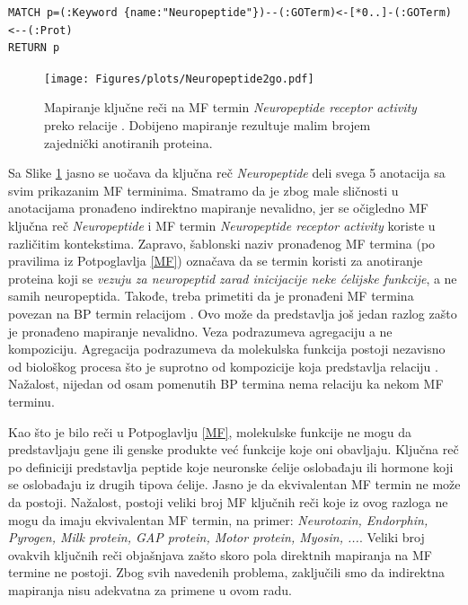 { \small
\begin{verbatim}
MATCH p=(:Keyword {name:"Neuropeptide"})--(:GOTerm)<-[*0..]-(:GOTerm)<--(:Prot)
RETURN p
\end{verbatim}
}

\begin{figure}[!th]
\centering
\hspace*{-1.0cm} 
\texttt{[image: Figures/plots/Neuropeptide2go.pdf]}
\decoRule
\caption {
  Mapiranje ključne reči  na MF termin
  \textit{Neuropeptide receptor activity} preko relacije .
  Dobijeno mapiranje rezultuje malim brojem zajednički anotiranih proteina.
}
\label{fig:neuropeptide}
\end{figure}

Sa Slike \ref{fig:neuropeptide} jasno se uočava da ključna reč
\textit{Neuropeptide} deli svega 5 anotacija sa svim prikazanim MF terminima.
Smatramo da je zbog male sličnosti u anotacijama pronađeno indirektno
mapiranje nevalidno, jer se očigledno MF ključna reč \textit{Neuropeptide} i
MF termin \textit{Neuropeptide receptor activity} koriste u različitim
kontekstima. Zapravo, šablonski naziv pronađenog MF termina (po pravilima iz
Potpoglavlja \ref{MF}) označava da se termin koristi za anotiranje proteina
koji se \textit{vezuju za neuropeptid zarad inicijacije neke ćelijske
funkcije}, a ne samih neuropeptida. Takođe, treba primetiti da je pronađeni MF
termina povezan na BP termin relacijom .  Ovo može da
predstavlja još jedan razlog zašto je pronađeno mapiranje nevalidno.  Veza
 podrazumeva agregaciju a ne kompoziciju. Agregacija
podrazumeva da  molekulska funkcija postoji nezavisno od biološkog procesa što
je suprotno od kompozicije koja predstavlja relaciju . Nažalost,
nijedan od osam pomenutih BP termina nema relaciju  ka nekom MF
terminu.

\clearpage

Kao što je bilo reči u Potpoglavlju \ref{MF}, molekulske funkcije ne mogu da
predstavljaju gene ili genske produkte već funkcije koje oni obavljaju. Ključna
reč  po definiciji predstavlja peptide koje neuronske
ćelije oslobađaju ili hormone koji se oslobađaju iz drugih tipova ćelije. Jasno
je da ekvivalentan MF termin ne može da postoji.  Nažalost, postoji veliki broj
MF ključnih reči koje iz ovog razloga ne mogu da imaju ekvivalentan MF termin,
na primer: \textit{ Neurotoxin, Endorphin, Pyrogen, Milk protein, GAP protein,
Motor protein, Myosin, ...}. Veliki broj ovakvih ključnih reči objašnjava 
zašto skoro pola direktnih mapiranja na MF termine ne postoji.  Zbog svih
navedenih problema, zaključili smo da indirektna mapiranja nisu adekvatna za
primene u ovom radu.

